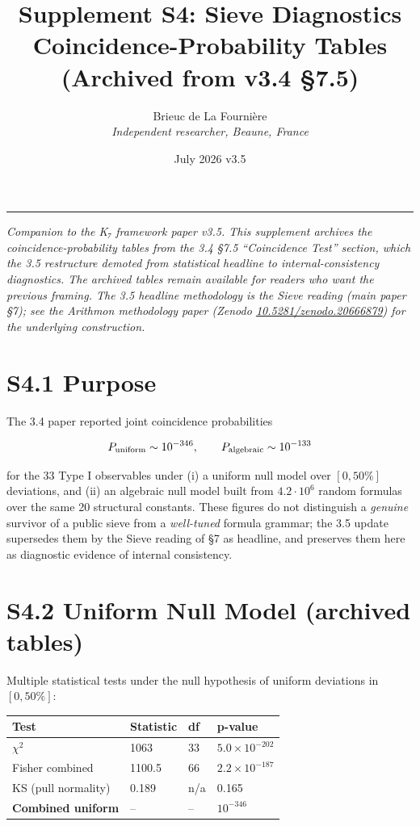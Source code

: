 \documentclass[11pt,a4paper]{article}
\title{%
\LARGE\textbf{Supplement S4: Sieve Diagnostics}\\[0.3em]
\large Coincidence-Probability Tables (Archived from v3.4 \S 7.5)%
}
\author{Brieuc de La Fourni\`ere \\ \textit{Independent researcher, Beaune, France}}
\date{July 2026 \quad\textbar\quad v3.5}
\begin{document}
\maketitle
\noindent\rule{\textwidth}{0.2pt}

\thispagestyle{fancy}

\emph{Companion to the K₇ framework paper v3.5. This supplement archives the coincidence-probability tables from the 3.4 §7.5 ``Coincidence Test'' section, which the 3.5 restructure demoted from statistical headline to internal-consistency diagnostics. The archived tables remain available for readers who want the previous framing. The 3.5 headline methodology is the Sieve reading (main paper §7); see the Arithmon methodology paper (Zenodo \href{https://doi.org/10.5281/zenodo.20666879}{10.5281/zenodo.20666879}) for the underlying construction.}

\section{S4.1 Purpose}\label{s4.1-purpose}

The 3.4 paper reported joint coincidence probabilities

\[
P_{\rm uniform} \sim 10^{-346}, \qquad P_{\rm algebraic} \sim 10^{-133}
\]

for the 33 Type I observables under (i) a uniform null model over \([0, 50\%]\) deviations, and (ii) an algebraic null model built from \(4.2 \cdot 10^6\) random formulas over the same 20 structural constants. These figures do not distinguish a \emph{genuine} survivor of a public sieve from a \emph{well-tuned} formula grammar; the 3.5 update supersedes them by the Sieve reading of §7 as headline, and preserves them here as diagnostic evidence of internal consistency.

\section{S4.2 Uniform Null Model (archived tables)}\label{s4.2-uniform-null-model-archived-tables}

Multiple statistical tests under the null hypothesis of uniform deviations in \([0, 50\%]\):

\begin{longtable}[]{@{}llll@{}}
\toprule\noalign{}
Test & Statistic & df & p-value \\
\midrule\noalign{}
\endhead
\bottomrule\noalign{}
\endlastfoot
\(\chi^2\) & 1063 & 33 & \(5.0 \times 10^{-202}\) \\
Fisher combined & 1100.5 & 66 & \(2.2 \times 10^{-187}\) \\
KS (pull normality) & 0.189 & n/a & 0.165 \\
\textbf{Combined uniform} & -- & -- & \textbf{\(10^{-346}\)} \\
\end{longtable}
\end{document}

